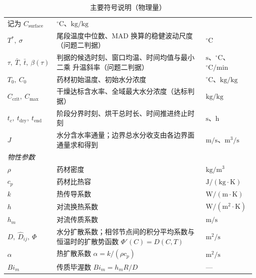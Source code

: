 \documentclass[12pt,a4paper]{ctexart}
\begin{document}
\begin{table}[H]
\begin{tabularx}{\textwidth}{@{}lXl@{}}
记为 $C_{\mathrm{surface}}$ & $^\circ\mathrm{C}$、$\mathrm{kg/kg}$ \\
$T^{*},\ \sigma$ & 尾段温度中位数、MAD 换算的稳健波动尺度（问题二判据） & $^\circ\mathrm{C}$ \\
$\tau,\ \bar T,\ \bar t,\ \beta(\tau)$ & 判据的候选时刻、窗口均温、时间均值与最小二乘
升温斜率（问题二判据） & $\mathrm{s}$、$^\circ\mathrm{C}$、$^\circ\mathrm{C/min}$ \\
$T_0,\ C_0$ & 药材初始温度、初始水分浓度 & $^\circ\mathrm{C}$、$\mathrm{kg/kg}$ \\
$C_{\mathrm{crit}},\ C_{\max}$ & 干燥达标含水率、全域最大水分浓度（达标判据） & $\mathrm{kg/kg}$ \\
$t_c,\ t_{\mathrm{dry}},\ t_{\mathrm{end}}$ & 阶段分界时刻、烘干总时长、时间推进终止时刻 & $\mathrm{s}$、$\mathrm{h}$ \\
$J$ & 水分含水率通量；边界总水分收支由各边界面通量求和得到 & $\mathrm{m/s}$、$\mathrm{m^3/s}$ \\
\midrule
\multicolumn{3}{l}{\textit{物性参数}}\\
$\rho$ & 药材密度 & $\mathrm{kg/m^3}$ \\
$c_p$ & 药材比热容 & $\mathrm{J/(kg\cdot K)}$ \\
$k$ & 热传导系数 & $\mathrm{W/(m\cdot K)}$ \\
$h$ & 对流换热系数 & $\mathrm{W/(m^2\cdot K)}$ \\
$h_m$ & 对流传质系数 & $\mathrm{m/s}$ \\
$D,\ \widehat D_{ij},\ \Phi$ & 水分扩散系数；相邻节点间的积分平均系数与恒温时的扩散势函数 $\Phi'(C)=D(C,T)$ & $\mathrm{m^2/s}$ \\
$\alpha$ & 热扩散系数 $\alpha=k/(\rho c_p)$ & $\mathrm{m^2/s}$ \\
$Bi_m$ & 传质毕渥数 $Bi_m=h_mR/D$ & — \\
\bottomrule
\end{tabularx}
\caption{主要符号说明（物理量）}
\label{tab:symbols}
\end{table}
\end{document}
